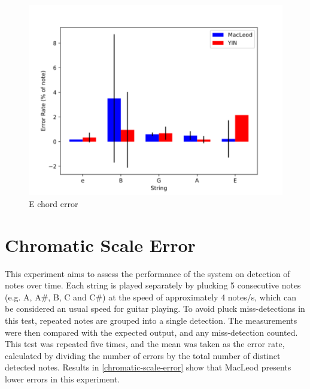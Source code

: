 \begin{figure}[!htpb]
  \centering
  \caption{E chord error}
  \label{e-chord-error}
  \includegraphics[scale=0.85]{images/measurements/e-chord-error}
\end{figure}

\section{Chromatic Scale Error}
This experiment aims to assess the performance of the system on detection of notes over time.
Each string is played separately by plucking 5 consecutive
notes (e.g. A, A\#, B, C and C\#) at the speed of approximately 4 notes/s, which can be
considered an usual speed for guitar playing. To avoid pluck miss-detections in this test, repeated
notes are grouped into a single detection. The measurements were then compared with the
expected output, and any miss-detection counted. This test was repeated five times,
and the mean was taken as the error rate, calculated by dividing the number of 
errors by the total number of distinct detected notes. Results in \autoref{chromatic-scale-error}
show that MacLeod presents lower errors in this experiment.

